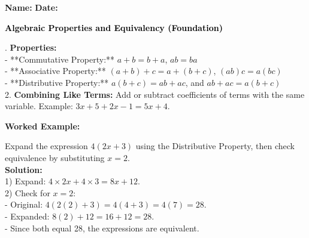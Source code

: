 \documentclass[12pt, letterpaper, fleqn]{article}
\begin{document}
\textbf{Name:} \underline{\hspace{5cm}}
\hfill
\textbf{Date:} \underline{\hspace{3cm}}\\

\begin{tcolorbox}[colback=customteal!20]
    \large\textcolor{black}{\textbf{Algebraic Properties and Equivalency (Foundation)}}
\end{tcolorbox}

\vspace{3mm}

. \textbf{Properties:} \\
- **Commutative Property:** $a + b = b + a$, $ab = ba$ \\
- **Associative Property:** $(a+b)+c = a+(b+c)$, $(ab)c = a(bc)$ \\
- **Distributive Property:** $a(b+c) = ab + ac$, and $ab + ac = a(b+c)$ \\
2. \textbf{Combining Like Terms:} Add or subtract coefficients of terms with the same variable. Example: $3x + 5 + 2x - 1 = 5x + 4$.

\vspace{4mm}

\begin{tcolorbox}[colback=white, colframe=black!25, boxrule=0.6pt, arc=4mm, left=6mm, right=6mm, top=5mm, bottom=5mm]
\textbf{Worked Example:}

\medskip
\noindent
Expand the expression $4(2x + 3)$ using the Distributive Property, then check equivalence by substituting $x=2$.\\
\textbf{Solution:} \\
1) Expand: $4 \times 2x + 4 \times 3 = 8x + 12$. \\
2) Check for $x=2$: \\
- Original: $4(2(2) + 3) = 4(4 + 3) = 4(7) = 28$. \\
- Expanded: $8(2) + 12 = 16 + 12 = 28$. \\
- Since both equal 28, the expressions are equivalent.
\end{tcolorbox}

\vspace{4mm}
\end{document}
